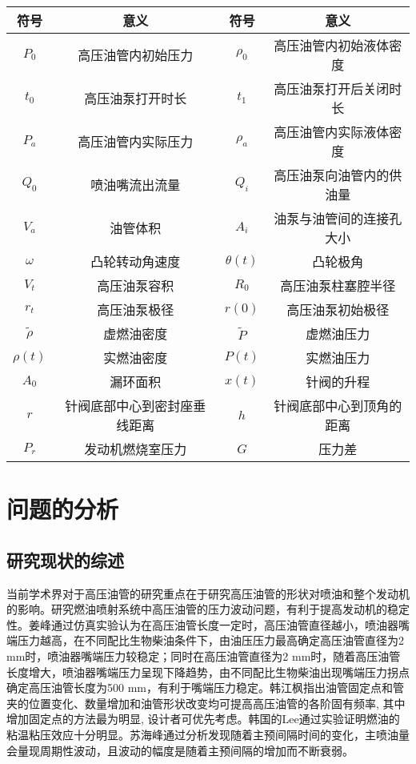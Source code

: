 \documentclass[withoutpreface,bwprint]{cumcmthesis} %
\begin{document}
\begin{table}[htbp]
	\centering
	\begin{tabular}{cccc}
		\hline
		\hline		
		符号    & 意义    & 符号    & 意义 \\
		\hline
		\hline
		$P_{0}$ & 高压油管内初始压力 & $\rho_{0}$ & 高压油管内初始液体密度 \\
		$t_{0}$ & 高压油泵打开时长 & $t_{1}$ & 高压油泵打开后关闭时长 \\
		$P_{a}$ & 高压油管内实际压力 & $\rho_{a}$ & 高压油管内实际液体密度 \\
		$Q_{0}$ & 喷油嘴流出流量 & $Q_{i}$ & 高压油泵向油管内的供油量 \\
		$V_{a}$ & 油管体积  & $A_{i}$ & 油泵与油管间的连接孔大小 \\
		$\omega$ & 凸轮转动角速度 & $\theta(t)$ & 凸轮极角 \\
		$V_{t}$ & 高压油泵容积 & $R_{0}$ & 高压油泵柱塞腔半径 \\
		$r_{t}$ & 高压油泵极径 & $r(0)$ & 高压油泵初始极径 \\
		$\widetilde{\rho}$ & 虚燃油密度 & $\widetilde{P}$ & 虚燃油压力 \\
		$\rho(t)$ & 实燃油密度 & $P(t)$ & 实燃油压力 \\
		$A_{0}$ & 漏环面积  & $x(t)$ & 针阀的升程 \\
		$r$   & 针阀底部中心到密封座垂线距离 & $h$   & 针阀底部中心到顶角的距离 \\
		$P_{r}$ & 发动机燃烧室压力 & $G$   & 压力差 \\
		\hline
		\hline
	\end{tabular}%
	\label{tab:fhsm}%
\end{table}%



\section{问题的分析}
\subsection{研究现状的综述}

当前学术界对于高压油管的研究重点在于研究高压油管的形状对喷油和整个发动机的影响。研究燃油喷射系统中高压油管的压力波动问题，有利于提高发动机的稳定性。姜峰通过仿真实验认为在高压油管长度一定时，高压油管直径越小，喷油器嘴端压力越高，在不同配比生物柴油条件下，由油压压力最高确定高压油管直径为2 mm时，喷油器嘴端压力较稳定；同时在高压油管直径为2 mm时，随着高压油管长度增大，喷油器嘴端压力呈现下降趋势，由不同配比生物柴油出现嘴端压力拐点确定高压油管长度为500 mm，有利于嘴端压力稳定。韩江枫指出油管固定点和管夹的位置变化、数量增加和油管形状改变均可提高高压油管的各阶固有频率, 其中增加固定点的方法最为明显, 设计者可优先考虑。韩国的Lee通过实验证明燃油的粘温粘压效应十分明显。苏海峰通过分析发现随着主预间隔时间的变化，主喷油量会量现周期性波动，且波动的幅度是随着主预间隔的增加而不断衰弱。
\end{document}
